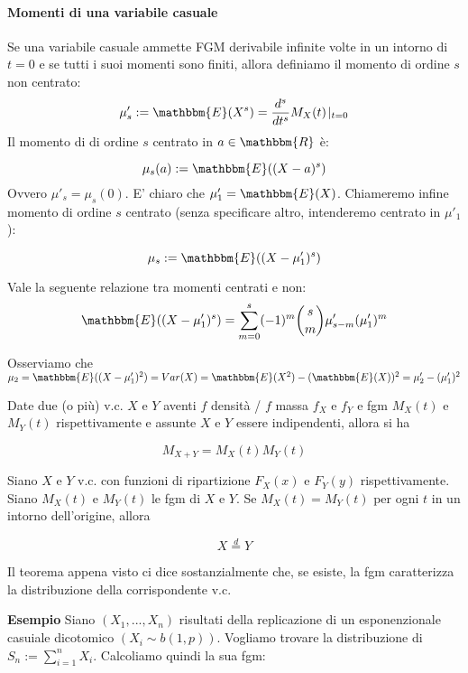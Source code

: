 \paragraph{Momenti di una variabile casuale}

\begin{definizione}
Se una variabile casuale ammette FGM derivabile infinite volte in un intorno di $t=0$ e se tutti i suoi momenti sono finiti, allora definiamo il momento di ordine $s$ non centrato: 
$$\mu'_s := \mathbbm{E} (X^s) = \frac{d^s}{dt^s} M_X (t) \! \mid_{t=0}$$ 
Il momento di di ordine $s$ centrato in $a \in \mathbbm{R}$ è: 

$$\mu_s (a) := \mathbbm{E} ((X-a)^s)$$
Ovvero $\mu'_s = \mu_s (0)$. E' chiaro che $\mu'_1 = \mathbbm{E} (X)$.
Chiameremo infine momento di ordine $s$ centrato (senza specificare altro, intenderemo centrato in $\mu'_1$):

$$\mu_s := \mathbbm{E} ((X-\mu'_1)^s)$$
\end{definizione}

\begin{teo}
Vale la seguente relazione tra momenti centrati e non:
$$\mathbbm{E} ((X-\mu'_1)^s) = \displaystyle\sum_{m=0}^s (-1)^m \binom{s}{m} \mu'_{s-m} (\mu'_1)^m$$
\end{teo}

Osserviamo che $\mu_2 = \mathbbm{E} ((X-\mu'_1)^2) = Var(X) = \mathbbm{E} (X^2) - (\mathbbm{E} (X))^2 = \mu'_2 - (\mu'_1)^2$


\begin{teo}
Date due (o più) v.c. $X$ e $Y$ aventi $f$ densità / $f$ massa $f_X$ e $f_Y$ e fgm $M_X(t)$ e $M_Y(t)$ rispettivamente e assunte $X$ e $Y$ essere indipendenti, allora si ha

$$M_{X+Y} = M_X(t) M_Y(t)$$
\end{teo}

\begin{teo}
Siano $X$ e $Y$ v.c. con funzioni di ripartizione $F_X(x)$ e $F_Y(y)$ rispettivamente. Siano $M_X(t)$ e $M_Y(t)$ le fgm di $X$ e $Y$. Se $M_X(t) = M_Y(t)$ per ogni $t$ in un intorno dell'origine, allora 

$$X \stackrel{d}{=} Y$$
\end{teo}

\begin{oss}
Il teorema appena visto ci dice sostanzialmente che, se esiste, la fgm caratterizza la distribuzione della corrispondente v.c.
\end{oss}
\textbf{Esempio}
Siano $(X_1,...,X_n)$ risultati della replicazione di un esponenzionale casuiale dicotomico $(X_i \sim b(1,p))$. Vogliamo trovare la distribuzione di $S_n := \displaystyle\sum_{i=1}^n X_i$. Calcoliamo quindi la sua fgm:

